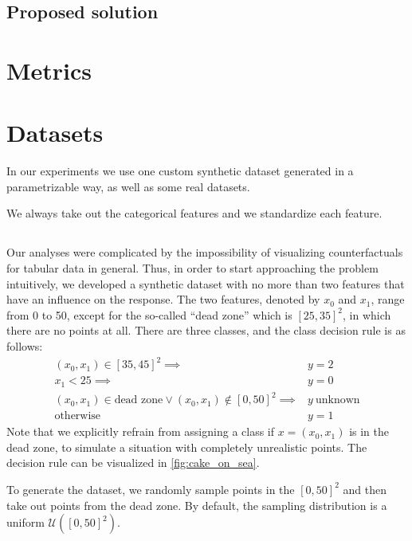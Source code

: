 \documentclass[../main.tex]{subfiles}
\begin{document}
\subsection{Proposed solution}

\section{Metrics}


\section{Datasets}
\label{sec:datasets}

In our experiments we use one custom synthetic dataset generated in a parametrizable way, as well as some real datasets.

We always take out the categorical features and we standardize each feature.

\subsection{\CakeOnSea}

Our analyses were complicated by the impossibility of visualizing counterfactuals for tabular data in general.
Thus, in order to start approaching the problem intuitively, we developed a synthetic dataset with no more than two features that have an influence on the response.
The two features, denoted by $x_0$ and $x_1$, range from 0 to 50, except for the so-called ``dead zone'' which is $[25, 35]^2$, in which there are no points at all.
There are three classes, and the class decision rule is as follows:
\begin{align*}
    (x_0, x_1) \in [35, 45]^2 \implies & y = 2 \\
    x_1 < 25                  \implies & y = 0 \\
    (x_0, x_1) \in \text{dead zone} \lor (x_0, x_1) \notin [0, 50]^2  \implies & y\ \text{unknown} \\
    \text{otherwise} \qquad            & y = 1
\end{align*}
Note that we explicitly refrain from assigning a class if $x = (x_0, x_1)$ is in the dead zone, to simulate a situation with completely unrealistic points.
The decision rule can be visualized in \autoref{fig:cake_on_sea}.

To generate the dataset, we randomly sample points in the $[0, 50]^2$ and then take out points from the dead zone. By default, the sampling distribution is a uniform $\mathcal{U}([0, 50]^2)$.
\end{document}
